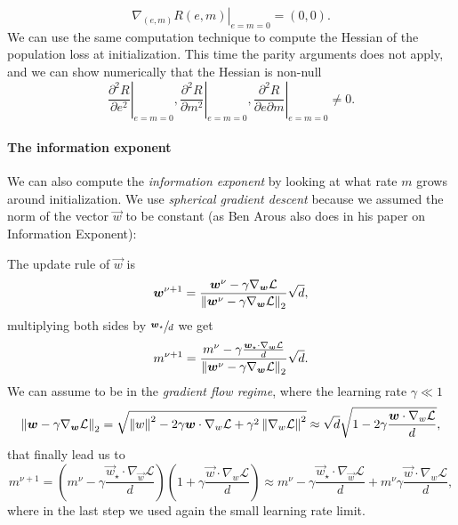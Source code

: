 \begin{equation}
    \left.\nabla_{(e,m)} R(e,m)\right|_{e=m=0} = (0,0).
\end{equation}
We can use the same computation technique to compute the Hessian of the population loss at initialization. This time the parity arguments does not apply, and we can show numerically that the Hessian is non-null
\begin{equation}
    \left.\frac{\partial^2 R}{\partial e^2}\right|_{e=m=0},
    \left.\frac{\partial^2 R}{\partial m^2}\right|_{e=m=0},
    \left.\frac{\partial^2 R}{\partial e \partial m}\right|_{e=m=0} \neq 0.
\end{equation}

\paragraph{The information exponent}
 We can also compute the \textit{information exponent} by looking at what rate \(m\) grows around initialization. We use \emph{spherical gradient descent} because we assumed the norm of the vector \(\vec w\) to be constant (as Ben Arous also does in his paper on Information Exponent):

 The update rule of \(\vec w\) is
 \[
    {\boldsymbol{w}}^{\nu+1} = \frac{{\boldsymbol{w}}^\nu - \gamma \nabla_{{\boldsymbol{w}}}\mathcal{L}}{\left\lVert {\boldsymbol{w}}^\nu - \gamma \nabla_{{\boldsymbol{w}}}\mathcal{L}\right\rVert_2}\sqrt{d},
 \]
 multiplying both sides by \(\sfrac{{\boldsymbol{w}}_\star}{d}\) we get
  \[
    m^{\nu+1} = \frac{m^\nu - \gamma \frac{{\boldsymbol{w}}_\star\cdot\nabla_{{\boldsymbol{w}}}\mathcal{L}}{d}}{\left\lVert {\boldsymbol{w}}^\nu - \gamma \nabla_{{\boldsymbol{w}}}\mathcal{L}\right\rVert_2}\sqrt{d}.
 \]
We can assume to be in the \emph{gradient flow regime}, where the learning rate \(\gamma \ll 1\)
\[
   \left\lVert {\boldsymbol{w}} - \gamma \nabla_{{\boldsymbol{w}}}\mathcal{L}\right\rVert_2 =
    \sqrt{\left\lVert w\right\rVert^2-2\gamma {\boldsymbol{w}}\cdot\nabla_w\mathcal{L} + \gamma^2\left\lVert \nabla_w\mathcal{L}\right\rVert^2}
        \approx \sqrt{d} \sqrt{1-2\gamma \frac{{\boldsymbol{w}}\cdot\nabla_w\mathcal{L}}{d}},
\]
that finally lead us to
\begin{equation} \label{2506:eq:m-update-normalized-gradient}
    m^{\nu+1} = \left(m^\nu - \gamma \frac{\vec{w}_\star\cdot\nabla_{\vec{w}}\mathcal{L}}{d}\right)\left(1+\gamma \frac{\vec{w}\cdot\nabla_w\mathcal{L}}{d}\right)
    \approx m^\nu - \gamma \frac{\vec{w}_\star\cdot\nabla_{\vec{w}}\mathcal{L}}{d} + m^\nu\gamma \frac{\vec{w}\cdot\nabla_w\mathcal{L}}{d},
\end{equation}
where in the last step we used again the small learning rate limit.
 
